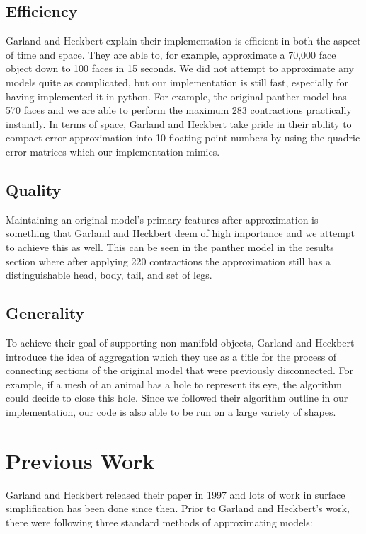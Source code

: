 \documentclass{acmsiggraph}
\begin{document}
\subsection{Efficiency}
Garland and Heckbert explain their implementation is efficient in both the
aspect of time and space. They are able to, for example, approximate a 70,000
face object down to 100 faces in 15 seconds. We did not attempt to approximate
any models quite as complicated, but our implementation is still fast,
especially for having implemented it in python. For example, the original
panther model has 570 faces and we are able to perform the maximum 283
contractions practically instantly. In terms of space, Garland and Heckbert
take pride in their ability to compact error approximation into 10 floating
point numbers by using the quadric error matrices which our implementation
mimics.

\subsection{Quality}
Maintaining an original model’s primary features after approximation is
something that Garland and Heckbert deem of high importance and we attempt to
achieve this as well. This can be seen in the panther model in the results
section where after applying 220 contractions the approximation still has a
distinguishable head, body, tail, and set of legs.

\subsection{Generality}
To achieve their goal of supporting non-manifold objects, Garland and Heckbert
introduce the idea of aggregation which they use as a title for the process of
connecting sections of the original model that were previously disconnected.
For example, if a mesh of an animal has a hole to represent its eye, the
algorithm could decide to close this hole. Since we followed their algorithm
outline in our implementation, our code is also able to be run on a large
variety of shapes.

\section{Previous Work}
Garland and Heckbert released their paper in 1997 and lots of work in surface
simplification has been done since then. Prior to Garland and Heckbert’s work,
there were following three standard methods of approximating models:
\end{document}
